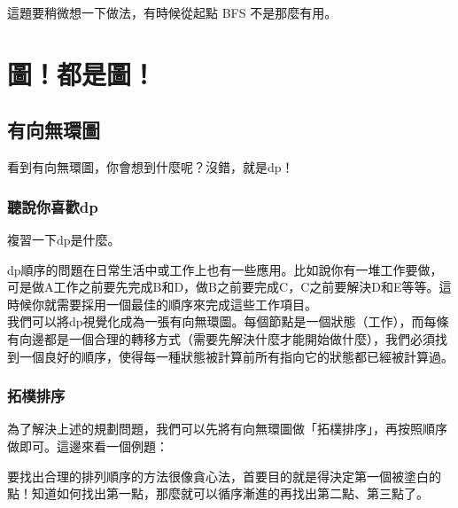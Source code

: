 \documentclass[main.tex]{subfiles}
\begin{document}

這題要稍微想一下做法，有時候從起點 BFS 不是那麼有用。

\chapter{圖！都是圖！}

\section{有向無環圖}

看到有向無環圖，你會想到什麼呢？沒錯，就是dp！

\subsection{聽說你喜歡dp}
複習一下dp是什麼。

dp順序的問題在日常生活中或工作上也有一些應用。比如說你有一堆工作要做，可是做A工作之前要先完成B和D，做B之前要完成C，C之前要解決D和E等等。這時候你就需要採用一個最佳的順序來完成這些工作項目。\\

我們可以將dp視覺化成為一張有向無環圖。每個節點是一個狀態（工作），而每條有向邊都是一個合理的轉移方式（需要先解決什麼才能開始做什麼），我們必須找到一個良好的順序，使得每一種狀態被計算前所有指向它的狀態都已經被計算過。\\

\subsection{拓樸排序}
為了解決上述的規劃問題，我們可以先將有向無環圖做「拓樸排序」，再按照順序做即可。這邊來看一個例題：\\


要找出合理的排列順序的方法很像貪心法，首要目的就是得決定第一個被塗白的點！知道如何找出第一點，那麼就可以循序漸進的再找出第二點、第三點了。\\
\end{document}

